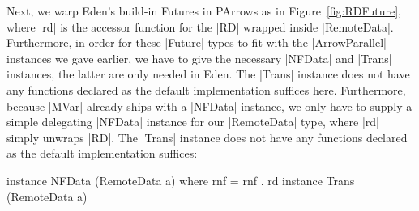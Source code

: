%
Next, we warp Eden's build-in Futures in PArrows as in
Figure~\ref{fig:RDFuture}, where |rd| is the accessor function for the |RD| wrapped inside |RemoteData|. Furthermore, in order for these |Future| types to fit with the |ArrowParallel| instances we gave earlier, we have to give the necessary |NFData| and |Trans| instances, the latter are only needed in Eden. The |Trans| instance does not have any functions declared as the default implementation suffices here. Furthermore, because |MVar| already ships with a |NFData| instance, we only have to supply a simple delegating |NFData| instance for our |RemoteData| type, where |rd| simply unwraps |RD|. The |Trans| instance does not have any functions declared as the default implementation suffices:

\begin{code}
instance NFData (RemoteData a) where
    rnf = rnf . rd
instance Trans (RemoteData a)
\end{code}

